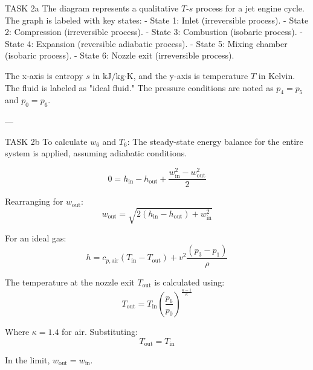 TASK 2a  
The diagram represents a qualitative \( T \)-\( s \) process for a jet engine cycle. The graph is labeled with key states:  
- State 1: Inlet (irreversible process).  
- State 2: Compression (irreversible process).  
- State 3: Combustion (isobaric process).  
- State 4: Expansion (reversible adiabatic process).  
- State 5: Mixing chamber (isobaric process).  
- State 6: Nozzle exit (irreversible process).  

The x-axis is entropy \( s \) in \( \text{kJ}/\text{kg·K} \), and the y-axis is temperature \( T \) in Kelvin. The fluid is labeled as "ideal fluid." The pressure conditions are noted as \( p_4 = p_5 \) and \( p_0 = p_6 \).  

---

TASK 2b  
To calculate \( w_6 \) and \( T_6 \):  
The steady-state energy balance for the entire system is applied, assuming adiabatic conditions.  

\[
0 = h_{\text{in}} - h_{\text{out}} + \frac{w_{\text{in}}^2 - w_{\text{out}}^2}{2}
\]

Rearranging for \( w_{\text{out}} \):  
\[
w_{\text{out}} = \sqrt{2(h_{\text{in}} - h_{\text{out}}) + w_{\text{in}}^2}
\]

For an ideal gas:  
\[
h = c_{p,\text{air}}(T_{\text{in}} - T_{\text{out}}) + v^2 \frac{(p_3 - p_1)}{\rho}
\]

The temperature at the nozzle exit \( T_{\text{out}} \) is calculated using:  
\[
T_{\text{out}} = T_{\text{in}} \left(\frac{p_6}{p_0}\right)^{\frac{\kappa - 1}{\kappa}}
\]

Where \( \kappa = 1.4 \) for air. Substituting:  
\[
T_{\text{out}} = T_{\text{in}}
\]

In the limit, \( w_{\text{out}} = w_{\text{in}} \).
